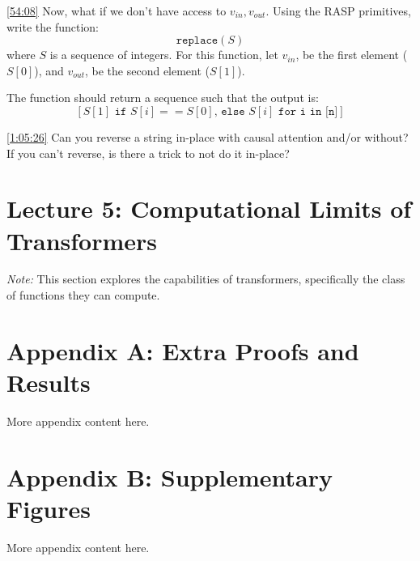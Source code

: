 \documentclass[12pt, twoside]{article}
\begin{document}
\begin{exercise} \label{ex:3.2}\href{https://youtu.be/2MRAX8EdBA8?si=oSIV4BYVMGFX85G-&t=3243}{[54:08]}
Now, what if we don't have access to $v_{in}, v_{out}$. Using the RASP primitives, write the function:
$$ \texttt{replace}(S) $$
where $S$ is a sequence of integers. For this function, let $v_{in}$, be the first element ($S[0]$), and $v_{out}$, be the second element ($S[1]$).

The function should return a sequence such that the output is:
$$ [S[1] \texttt{ if } S[i] == S[0]\texttt{, else } S[i] \texttt{ for i in [n]}] $$
\end{exercise}

\begin{exercise} \label{ex:3.3}\href{https://youtu.be/2MRAX8EdBA8?si=QGFYtKdnMASlIUWs}{[1:05:26]} Can you reverse a string in-place with causal attention and/or without? If you can't reverse, is there a trick to not do it in-place?

\end{exercise}

\newpage


\thispagestyle{RemoveHeader}


\section*{Lecture 5: Computational Limits of Transformers}

\textit{Note:} This section explores the capabilities of transformers, specifically the class of functions they can compute.

\newpage

\section*{Appendix A: Extra Proofs and Results}

More appendix content here.

\section*{Appendix B: Supplementary Figures}

More appendix content here.

\newpage
\printbibliography

\end{document}
